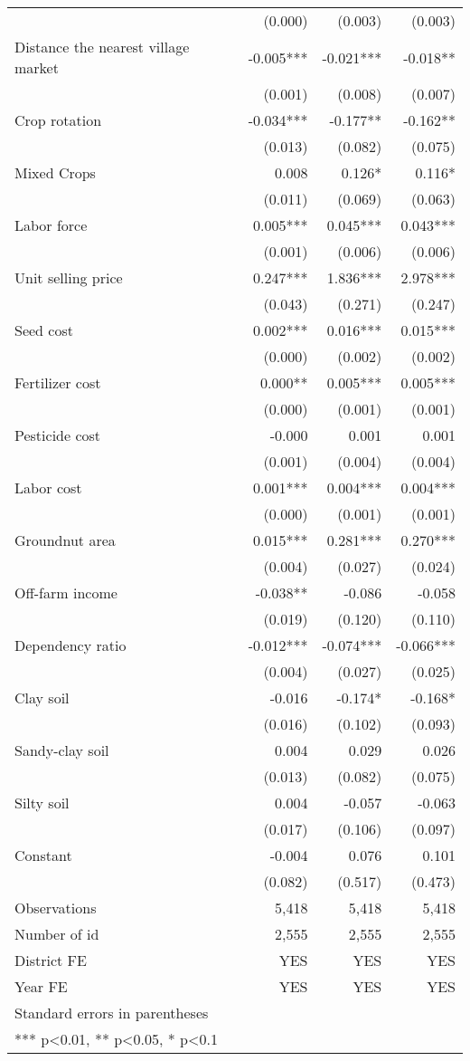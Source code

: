 \documentclass[
]{article}
\begin{document}
\begin{longtable}[t]{lrrr}
 & (0.000) & (0.003) & (0.003)\\
Distance the nearest village market & -0.005*** & -0.021*** & -0.018**\\
 & (0.001) & (0.008) & (0.007)\\
Crop rotation & -0.034*** & -0.177** & -0.162**\\
\addlinespace
 & (0.013) & (0.082) & (0.075)\\
Mixed Crops & 0.008 & 0.126* & 0.116*\\
 & (0.011) & (0.069) & (0.063)\\
Labor force & 0.005*** & 0.045*** & 0.043***\\
 & (0.001) & (0.006) & (0.006)\\
\addlinespace
Unit selling price & 0.247*** & 1.836*** & 2.978***\\
 & (0.043) & (0.271) & (0.247)\\
Seed cost & 0.002*** & 0.016*** & 0.015***\\
 & (0.000) & (0.002) & (0.002)\\
Fertilizer cost & 0.000** & 0.005*** & 0.005***\\
\addlinespace
 & (0.000) & (0.001) & (0.001)\\
Pesticide cost & -0.000 & 0.001 & 0.001\\
 & (0.001) & (0.004) & (0.004)\\
Labor cost & 0.001*** & 0.004*** & 0.004***\\
 & (0.000) & (0.001) & (0.001)\\
\addlinespace
Groundnut area & 0.015*** & 0.281*** & 0.270***\\
 & (0.004) & (0.027) & (0.024)\\
Off-farm income & -0.038** & -0.086 & -0.058\\
 & (0.019) & (0.120) & (0.110)\\
Dependency ratio & -0.012*** & -0.074*** & -0.066***\\
\addlinespace
 & (0.004) & (0.027) & (0.025)\\
Clay soil & -0.016 & -0.174* & -0.168*\\
 & (0.016) & (0.102) & (0.093)\\
Sandy-clay soil & 0.004 & 0.029 & 0.026\\
 & (0.013) & (0.082) & (0.075)\\
\addlinespace
Silty soil & 0.004 & -0.057 & -0.063\\
 & (0.017) & (0.106) & (0.097)\\
Constant & -0.004 & 0.076 & 0.101\\
 & (0.082) & (0.517) & (0.473)\\
Observations & 5,418 & 5,418 & 5,418\\
\addlinespace
Number of id & 2,555 & 2,555 & 2,555\\
District FE & YES & YES & YES\\
Year FE & YES & YES & YES\\
Standard errors in parentheses &  &  & \\
*** p<0.01, ** p<0.05, * p<0.1 &  &  & \\*
\end{longtable}
\endgroup{}
\end{document}
